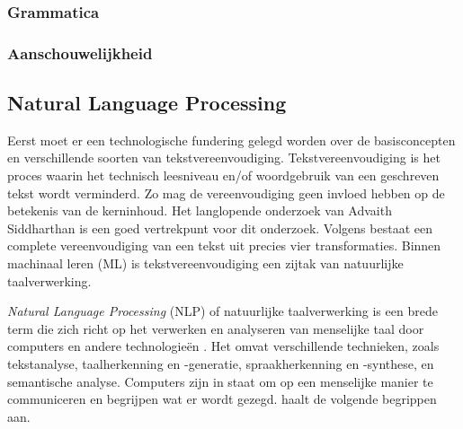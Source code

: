 \subsubsection{Grammatica}

\subsubsection{Aanschouwelijkheid}


\subsection{Natural Language Processing}

Eerst moet er een technologische fundering gelegd worden over de basisconcepten en verschillende soorten van tekstvereenvoudiging. Tekstvereenvoudiging is het proces waarin het technisch leesniveau en/of woordgebruik van een geschreven tekst wordt verminderd. Zo mag de vereenvoudiging geen invloed hebben op de betekenis van de kerninhoud. Het langlopende onderzoek van Advaith Siddharthan is een goed vertrekpunt voor dit onderzoek. Volgens \autocite{Siddharthan2014} bestaat een complete vereenvoudiging van een tekst uit precies vier transformaties. Binnen machinaal leren (ML) is tekstvereenvoudiging een zijtak van natuurlijke taalverwerking. %

\textit{Natural Language Processing} (NLP) of natuurlijke taalverwerking is een brede term die zich richt op het verwerken en analyseren van menselijke taal door computers en andere technologieën \autocite{Eisenstein2019}. Het omvat verschillende technieken, zoals tekstanalyse, taalherkenning en -generatie, spraakherkenning en -synthese, en semantische analyse. Computers zijn in staat om op een menselijke manier te communiceren en begrijpen wat er wordt gezegd. \textcite{Sohom2019} haalt de volgende begrippen aan.

